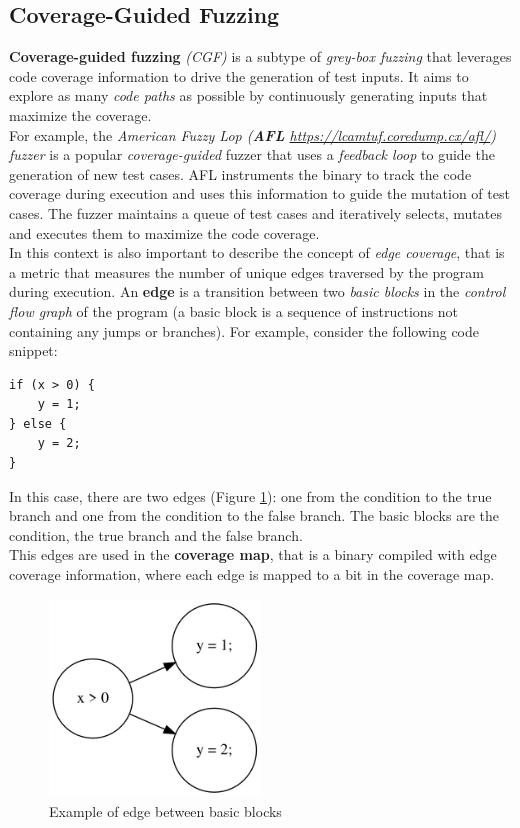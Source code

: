 \subsection{Coverage-Guided Fuzzing}
\textbf{Coverage-guided fuzzing} \textit{(CGF)} is a subtype of \textit{grey-box fuzzing} that leverages code coverage information to drive the generation of test inputs. It aims to explore as many \textit{code paths} as possible by continuously generating inputs that maximize the coverage.
\\For example, the \textit{American Fuzzy Lop (\textbf{AFL} \href{https://lcamtuf.coredump.cx/afl/}{https://lcamtuf.coredump.cx/afl/}) fuzzer} is a popular \textit{coverage-guided} fuzzer that uses a \textit{feedback loop} to guide the generation of new test cases. AFL instruments the binary to track the code coverage during execution and uses this information to guide the mutation of test cases. The fuzzer maintains a queue of test cases and iteratively selects, mutates and executes them to maximize the code coverage.
\\In this context is also important to describe the concept of \textit{edge coverage}, that is a metric that measures the number of unique edges traversed by the program during execution. An \textbf{edge} is a transition between two \textit{basic blocks} in the \textit{control flow graph} of the program (a basic block is a sequence of instructions not containing any jumps or branches).
For example, consider the following code snippet:
\begin{lstlisting}
if (x > 0) {
    y = 1;
} else {
    y = 2;
}
\end{lstlisting}
In this case, there are two edges (Figure \ref{fig:sample_edge_graph}): one from the condition to the true branch and one from the condition to the false branch. The basic blocks are the condition, the true branch and the false branch.
\\This edges are used in the \textbf{coverage map}, that is a binary compiled with edge coverage information, where each edge is mapped to a bit in the coverage map.
\begin{figure}[H]
    \centering
    \includegraphics[width=0.5\textwidth]{Images/sample_edge_graph.png}
    \caption{Example of edge between basic blocks}
    \label{fig:sample_edge_graph}
\end{figure}
